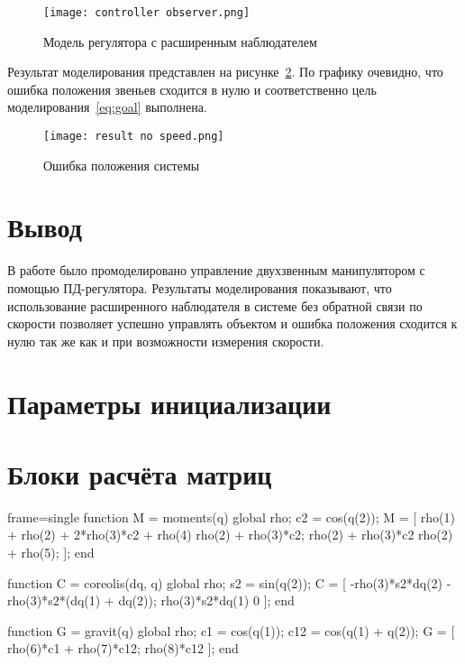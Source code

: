 \documentclass[14pt]{extarticle}
\begin{document}
    \begin{figure}[H]
        \centering
        \texttt{[image: controller observer.png]}
        \caption{Модель регулятора с расширенным наблюдателем}
        \label{pic:controller observer}
    \end{figure}

    Результат моделирования представлен на рисунке~\ref{pic:result no speed}. По графику очевидно, что ошибка
    положения звеньев сходится в нулю и соответственно цель моделирования~\eqref{eq:goal} выполнена.
    \begin{figure}[H]
        \centering
        \texttt{[image: result no speed.png]}
        \caption{Ошибка положения системы}
        \label{pic:result no speed}
    \end{figure}

    \section*{Вывод}
    В работе было промоделировано управление двухзвенным манипулятором с помощью ПД-регулятора.
    Результаты моделирования показывают, что использование расширенного наблюдателя в системе без
    обратной связи по скорости позволяет успешно управлять объектом и ошибка положения сходится
    к нулю так же как и при возможности измерения скорости.

    \appendix \newpage
    \renewcommand{\thesection}{Приложение \Asbuk{section}}
    \section{Параметры инициализации}\label{code:given}

    \newpage
    \section{Блоки расчёта матриц}\label{code:matricies}
    \begin{octavecode*}{frame=single}
        function M = moments(q)
            global rho;
            c2 = cos(q(2));
            M = [
                rho(1) + rho(2) + 2*rho(3)*c2 + rho(4) rho(2) + rho(3)*c2;
                rho(2) + rho(3)*c2 rho(2) + rho(5);
                ];
        end

        function C = coreolis(dq, q)
            global rho;
            s2 = sin(q(2));
            C = [
                -rho(3)*s2*dq(2) -rho(3)*s2*(dq(1) + dq(2));
                rho(3)*s2*dq(1) 0
                ];
        end

        function G = gravit(q)
            global rho;
            c1 = cos(q(1));
            c12 = cos(q(1) + q(2));
            G = [
                rho(6)*c1 + rho(7)*c12;
                rho(8)*c12
                ];
        end
    \end{octavecode*}
\end{document}
